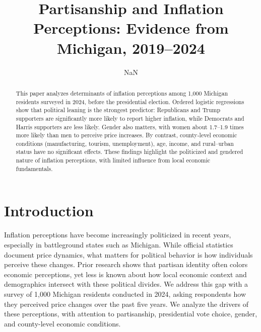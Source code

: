\documentclass[preprint,12pt,authoryear]{elsarticle}
\begin{document}

\begin{frontmatter}

\title{Partisanship and Inflation Perceptions: Evidence from Michigan, 2019–2024}

\author[1]{NaN
}



\address[1]{NaN}




\begin{abstract}
This paper analyzes determinants of inflation perceptions among 1,000 Michigan residents surveyed in 2024, before the presidential election. Ordered logistic regressions show that political leaning is the strongest predictor: Republicans and Trump supporters are significantly more likely to report higher inflation, while Democrats and Harris supporters are less likely. Gender also matters, with women about 1.7–1.9 times more likely than men to perceive price increases. By contrast, county-level economic conditions (manufacturing, tourism, unemployment), age, income, and rural–urban status have no significant effects. These findings highlight the politicized and gendered nature of inflation perceptions, with limited influence from local economic fundamentals.
\end{abstract}


\begin{keyword}

\end{keyword}

\end{frontmatter}

\newpage


\section{Introduction}

Inflation perceptions have become increasingly politicized in recent years, especially in battleground states such as Michigan. While official statistics document price dynamics, what matters for political behavior is how individuals perceive these changes. Prior research shows that partisan identity often colors economic perceptions, yet less is known about how local economic context and demographics intersect with these political divides. We address this gap with a survey of 1,000 Michigan residents conducted in 2024, asking respondents how they perceived price changes over the past five years. We analyze the drivers of these perceptions, with attention to partisanship, presidential vote choice, gender, and county-level economic conditions.
\end{document}
